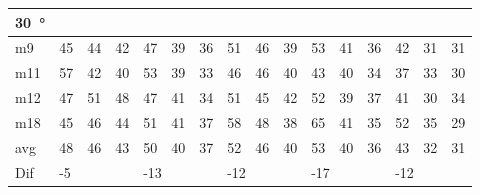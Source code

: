 \begin{table}[H]
\centering    
\begin{tabular}{l|l|l|l|l|l|l|l|l|l|l|l|l|lll}                         
\SI{30}{\degree}   & \multicolumn{3}{l|}{} & \multicolumn{3}{l|}{} & \multicolumn{3}{l|}{} & \multicolumn{3}{l|}{} & \multicolumn{3}{l}{}   \\  \hline
m9    &  45    &  44    &  42    &  47    &  39    &   36   &  51    &   46    &  39    &   53    &   41   &   36   & \multicolumn{1}{l|}{42} & \multicolumn{1}{l|}{31} & 31 \\
m11  &  57    &  42    &  40    &   53   &   39   &   33   &  46    &   46    &  40    &    43   &   40   &  34   & \multicolumn{1}{l|}{37} & \multicolumn{1}{l|}{33} & 30 \\
m12  &  47    &   51   &  48    &  47    &   41   &   34   &   51   &  45     &   42   &    52   &   39   &   37   & \multicolumn{1}{l|}{41} & \multicolumn{1}{l|}{30} & 34 \\
m18  &  45    &   46   &  44    &   51   &  41    &   37   &   58   &   48    &  38    &    65   &  41    &   35   & \multicolumn{1}{l|}{52} & \multicolumn{1}{l|}{35} & 29 \\ \hline
avg &  48    &  46    &  43    &  50    & 40     &  37    &   52   &  46     &  40    &  53     &   40   &  36    & \multicolumn{1}{l|}{43} & \multicolumn{1}{l|}{32}  & 31 \\ \hline  
Dif & \multicolumn{3}{l|}{-5} & \multicolumn{3}{l|}{-13} & \multicolumn{3}{l|}{-12} & \multicolumn{3}{l|}{-17} & \multicolumn{3}{l}{-12}                                
\end{tabular}
\end{table}


